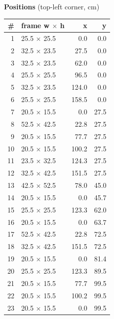 \documentclass[a4paper,landscape,10pt]{article}
\begin{document}
\begin{minipage}[t]{0.25\textwidth}
\vspace{8pt}
{\bfseries Positions} (top-left corner, cm)\\[2pt]
\tiny
\begin{tabular}{@{}r l r r@{}}
\toprule
\# & frame w $\times$ h & x & y \\
\midrule
1 & 25.5 $\times$ 25.5 & 0.0 & 0.0 \\
2 & 32.5 $\times$ 23.5 & 27.5 & 0.0 \\
3 & 32.5 $\times$ 23.5 & 62.0 & 0.0 \\
4 & 25.5 $\times$ 25.5 & 96.5 & 0.0 \\
5 & 32.5 $\times$ 23.5 & 124.0 & 0.0 \\
6 & 25.5 $\times$ 25.5 & 158.5 & 0.0 \\
7 & 20.5 $\times$ 15.5 & 0.0 & 27.5 \\
8 & 52.5 $\times$ 42.5 & 22.8 & 27.5 \\
9 & 20.5 $\times$ 15.5 & 77.7 & 27.5 \\
10 & 20.5 $\times$ 15.5 & 100.2 & 27.5 \\
11 & 23.5 $\times$ 32.5 & 124.3 & 27.5 \\
12 & 32.5 $\times$ 42.5 & 151.5 & 27.5 \\
13 & 42.5 $\times$ 52.5 & 78.0 & 45.0 \\
14 & 20.5 $\times$ 15.5 & 0.0 & 45.7 \\
15 & 25.5 $\times$ 25.5 & 123.3 & 62.0 \\
16 & 20.5 $\times$ 15.5 & 0.0 & 63.7 \\
17 & 52.5 $\times$ 42.5 & 22.8 & 72.5 \\
18 & 32.5 $\times$ 42.5 & 151.5 & 72.5 \\
19 & 20.5 $\times$ 15.5 & 0.0 & 81.4 \\
20 & 25.5 $\times$ 25.5 & 123.3 & 89.5 \\
21 & 20.5 $\times$ 15.5 & 77.7 & 99.5 \\
22 & 20.5 $\times$ 15.5 & 100.2 & 99.5 \\
23 & 20.5 $\times$ 15.5 & 0.0 & 99.5 \\
\bottomrule
\end{tabular}
\end{minipage}
\clearpage
\end{document}
